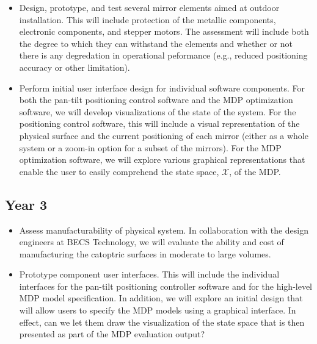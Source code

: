 \documentclass[11pt]{article}
\begin{document}
\begin{itemize}

\item Design, prototype, and test several mirror elements aimed at
outdoor installation. This will include protection of the metallic components,
electronic components, and stepper motors.  The assessment will include
both the degree to which they can withstand the elements and whether or
not there is any degredation in operational peformance (e.g., reduced
positioning accuracy or other limitation).

\item Perform initial user interface design for individual software components.
For both the pan-tilt positioning control software and the MDP optimization
software, we will develop visualizations of the state of the system.
For the positioning control software, this will include a visual representation
of the physical surface and the current positioning of each mirror
(either as a whole system or a zoom-in option for a subset of the mirrors).
For the MDP optimization software, we will explore various graphical
representations that enable the user to easily comprehend the state
space, $\mathcal{X}$, of the MDP.

\end{itemize}

\subsection*{Year 3}

\begin{itemize}

\item Assess manufacturability of physical system.  In collaboration with
the design engineers at BECS Technology, 
we will evaluate the ability and cost of manufacturing the catoptric
surfaces in moderate to large volumes.

\item Prototype component user interfaces. This will include the individual
interfaces for the pan-tilt positioning controller software
and for the high-level MDP model specification.
In addition, we will explore an initial design that will allow users
to specify the MDP models using a graphical interface.  In effect, can we
let them draw the visualization of the state space that is then presented
as part of the MDP evaluation output?

\end{itemize}
\end{document}
